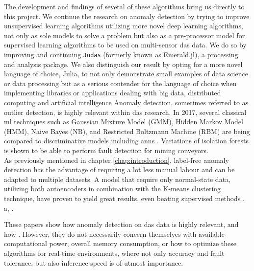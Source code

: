 The development and findings of several of these algorithms bring us directly to this project. We continue the research on anomaly detection by trying to improve unsupervised learning algorithms utilizing more novel deep learning algorithms, not only as sole models to solve a problem but also as a pre-processor model for supervised learning algorithms to be used on multi-sensor das data. We do so by improving and continuing \texttt{Judas} (formerly known as Emerald.jl), a processing and analysis package. We also distinguish our result by opting for a more novel language of choice, Julia, to not only demonstrate small examples of data science or data processing but as a serious contender for the language of choice when implementing libraries or applications dealing with big data, distributed computing and artificial intelligence
Anomaly detection, sometimes referred to as outlier detection, is highly relevant within \acrshort{das} research. In 2017, several classical \acrshort{ml} techniques such as Gaussian Mixture Model (GMM), Hidden Markov Model (HMM), Naive Bayes (NB), and Restricted Boltzmann Machine (RBM) are being compared to discriminative models including \acrshort{ann}s \cite{app7080841}. Variations of isolation forests is shown to be able to perform fault detection for mining conveyors\cite{WIJAYA2022110330}. \\

As previously mentioned in chapter \ref{chap:introduction}, label-free anomaly detection has the advantage of requiring a lot less manual labour and can be adapted to multiple datasets. A model that require only normal-state data, utilizing both autoencoders in combination with the K-means clustering technique, have proven to yield great results, even beating supervised methods \cite{s23084094}. \\ 

a, \cite{10.14778/3538598.3538602} \cite{10.1145/3444690}.

These papers show how anomaly detection on \acrshort{das} data is highly relevant, and how . However, they do not necessarily concern themselves with available computational power, overall memory consumption, or how to optimize these algorithms for real-time environments, where not only accuracy and fault tolerance, but also inference speed is of utmost importance.